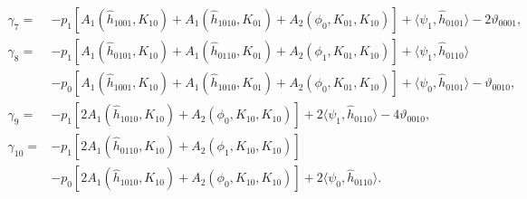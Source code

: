 \begin{equation}
\begin{aligned}
\gamma_7  ={}& - p_1 \left[A_1(\hat h_{1001},K_{10}) + A_1(\hat h_{1010},K_{01}) +  A_2(\phi_0,K_{01},K_{10})\right]
              + \langle\psi_1, \hat h_{0101} \rangle - 2 \vartheta_{0001}, \\
\gamma_8 ={}& -p_1 \left[A_1(\hat h_{0101},K_{10}) + A_1(\hat h_{0110},K_{01}) + A_2(\phi_1,K_{01},K_{10})\right] + \langle\psi_1, \hat h_{0110} \rangle\\
     & -p_0 \left[A_1(\hat h_{1001},K_{10}) + A_1(\hat h_{1010},K_{01}) + A_2(\phi_0,K_{01},K_{10})\right] + \langle\psi_0, \hat h_{0101}\rangle - \vartheta_{0010},\\
\gamma_9 ={}& -p_1 \left[2 A_1(\hat h_{1010},K_{10}) + A_2(\phi_0,K_{10},K_{10})\right] + 2 \langle\psi_1, \hat h_{0110} \rangle - 4 \vartheta_{0010}, \\
\gamma_{10} ={}& -p_1 \left[2 A_1(\hat h_{0110},K_{10}) + A_2(\phi_1,K_{10},K_{10})\right] \\
     & - p_0 \left[2 A_1(\hat h_{1010},K_{10}) + A_2(\phi_0,K_{10},K_{10})\right] + 2 \langle\psi_0, \hat h_{0110}\rangle.
\end{aligned}
\end{equation}
\begin{align*}
\end{align*}

